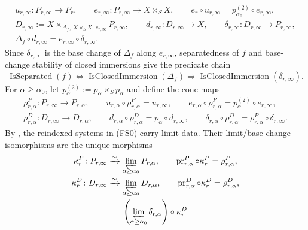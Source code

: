 \begin{definition}
\[\begin{gathered}
    u_{r,\infty}\colon P_{r,\infty}\to P_r,\qquad
    e_{r,\infty}\colon P_{r,\infty}\to X\times_SX,\qquad
    e_r\circ u_{r,\infty}=p_{\alpha_0}^{(2)}\circ e_{r,\infty},\\
    D_{r,\infty}:=
      X\times_{\Delta_f,\,X\times_SX,\,e_{r,\infty}}P_{r,\infty},
    \qquad
    d_{r,\infty}\colon D_{r,\infty}\to X,
    \qquad
    \delta_{r,\infty}\colon D_{r,\infty}\to P_{r,\infty},\\
    \Delta_f\circ d_{r,\infty}
      =e_{r,\infty}\circ\delta_{r,\infty}.
  \end{gathered}                                                  \tag{FS1}
  \]
  Since $\delta_{r,\infty}$ is the base change of $\Delta_f$ along
  $e_{r,\infty}$, separatedness of $f$ and base-change stability of closed
  immersions give the predicate chain
  \[
    \operatorname{IsSeparated}(f)
      \Longleftrightarrow
    \operatorname{IsClosedImmersion}(\Delta_f)
      \Longrightarrow
    \operatorname{IsClosedImmersion}(\delta_{r,\infty}).         \tag{FS2}
  \]
  For $\alpha\geq\alpha_0$, let
  $p^{(2)}_\alpha:=p_\alpha\times_Sp_\alpha$ and define the cone maps
  \[
  \begin{gathered}
    \rho^P_{r,\alpha}\colon P_{r,\infty}\to P_{r,\alpha},\qquad
    u_{r,\alpha}\circ\rho^P_{r,\alpha}=u_{r,\infty},\qquad
    e_{r,\alpha}\circ\rho^P_{r,\alpha}
      =p^{(2)}_\alpha\circ e_{r,\infty},\\
    \rho^D_{r,\alpha}\colon D_{r,\infty}\to D_{r,\alpha},\qquad
    d_{r,\alpha}\circ\rho^D_{r,\alpha}
      =p_\alpha\circ d_{r,\infty},\qquad
    \delta_{r,\alpha}\circ\rho^D_{r,\alpha}
      =\rho^P_{r,\alpha}\circ\delta_{r,\infty}.
  \end{gathered}                                                  \tag{FS3}
  \]
  By
  , the reindexed
  systems in (FS0) carry limit data.  Their limit/base-change isomorphisms
  are the unique morphisms
  \[
  \begin{gathered}
    \kappa^P_r\colon P_{r,\infty}
      \xrightarrow{\sim}\varprojlim_{\alpha\geq\alpha_0}P_{r,\alpha},
    \qquad \operatorname{pr}^P_{r,\alpha}\circ\kappa^P_r
      =\rho^P_{r,\alpha},\\
    \kappa^D_r\colon D_{r,\infty}
      \xrightarrow{\sim}\varprojlim_{\alpha\geq\alpha_0}D_{r,\alpha},
    \qquad \operatorname{pr}^D_{r,\alpha}\circ\kappa^D_r
      =\rho^D_{r,\alpha},\\
    \left(\varprojlim_{\alpha\geq\alpha_0}\delta_{r,\alpha}\right)
      \circ\kappa^D_r

\end{gathered}\]
\end{definition}

